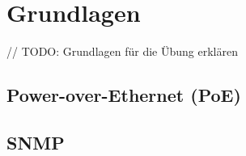 \section{Grundlagen}
\label{sec:basics}

// TODO: Grundlagen für die Übung erklären

\subsection{Power-over-Ethernet (PoE)}

\subsection{SNMP}

